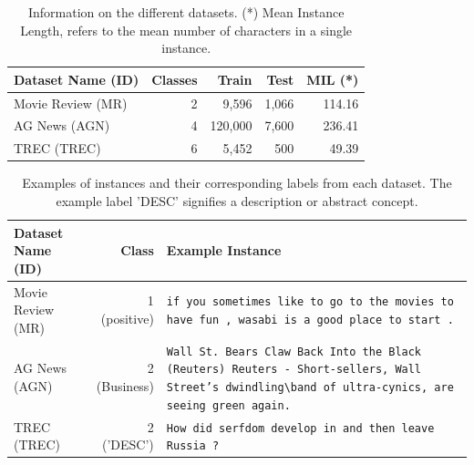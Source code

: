 \documentclass[english,bachelor,ul]{webisthesis} %
\begin{document}
\begin{table}[p]%
    \centering
    \setlength{\tabcolsep}{16pt} %
    \begin{tabular}{@{}lrrrr@{}} %
        \toprule
        \bfseries Dataset Name \scriptsize (ID) & \bfseries Classes & \bfseries Train & \bfseries Test & \bfseries MIL (*) \\
        \midrule
        Movie Review \scriptsize (MR) & 2 & 9,596 & 1,066 & 114.16 \\
        AG News \scriptsize (AGN) & 4 & 120,000 & 7,600 &  236.41 \\
        TREC \scriptsize (TREC) & 6 & 5,452 & 500 & 49.39 \\
        \bottomrule
    \end{tabular}
    \caption{Information on the different datasets. (*) Mean Instance Length, refers to the mean number of characters in a single instance.}
  \label{dataset-table}%
\end{table}

\begin{table}[htbp]
    \centering
    \renewcommand{\arraystretch}{1.5}
    \begin{tabular}{@{}lrp{7cm}@{}} 
        \toprule
        \textbf{Dataset Name} \scriptsize (ID) & \textbf{Class} & \textbf{Example Instance} \\
        \midrule
        Movie Review \scriptsize (MR) & 1 (positive) & \texttt{if you sometimes like to go to the movies to have fun , wasabi is a good place to start .} \\
        AG News \scriptsize (AGN) & 2  (Business) & \texttt{Wall St. Bears Claw Back Into the Black (Reuters) Reuters - Short-sellers, Wall Street's dwindling\textbackslash band of ultra-cynics, are seeing green again.} \\
        TREC \scriptsize (TREC) & 2 ('DESC') & \texttt{How did serfdom develop in and then leave Russia ?} \\
        \bottomrule
    \end{tabular}
    \caption{Examples of instances and their corresponding labels from each dataset. The example label 'DESC' signifies a description or abstract concept.}
    \label{tab:dataset-instances}
\end{table}
\end{document}
